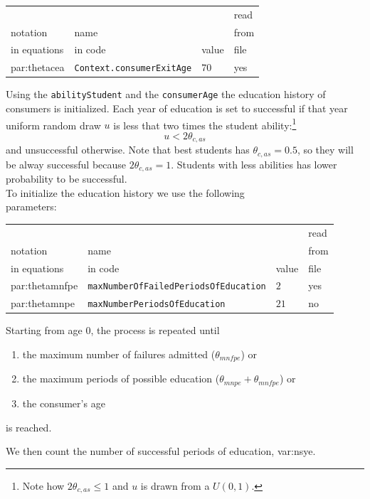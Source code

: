 \documentclass{book}
\begin{document}
\vskip2mm
\noindent
\begin{tabular}{l l l l}
	\hline
	& &&read\\
	notation& name &&from\\
	in equations& in code&value&file\\
	\hline
	\hline
\gls{par:thetacea}&\verb+Context.consumerExitAge+&$70$&yes\\
	\hline
\end{tabular}

\vskip5mm
Using the \verb+abilityStudent+ and the \verb+consumerAge+ the education history of consumers is initialized. Each year of education is set to successful if that year uniform random draw $u$ is less that two times the student ability:\footnote{Note how $2\theta_{c,as}\le 1$ and $u$ is drawn from a $U(0,1)$.}
\[
	u<2\theta_{c,as}
\]
and unsuccessful otherwise.  Note that best students has $\theta_{c,as}=0.5$, so they will be alway successful because $2\theta_{c,as}=1$. Students with less abilities has lower probability to be successful.\\

To initialize the education history we use the following\\ 
parameters:\\

\noindent
\begin{tabular}{l l l l}
	\hline
	& &&read\\
	notation& name &&from\\
	in equations& in code&value&file\\
	\hline
	\hline
\gls{par:thetamnfpe}&\verb+maxNumberOfFailedPeriodsOfEducation+&$2$&yes\\
\gls{par:thetamnpe}&\verb+maxNumberPeriodsOfEducation+&$21$&no\\
	\hline
\end{tabular}

\vskip5mm


Starting from age 0, the process is repeated until 
\begin{enumerate}
	\item the maximum number of failures admitted ($\theta_{mnfpe}$) or
	\item the maximum periods of possible education ($\theta_{mnpe}+\theta_{mnfpe}$) or
	\item the consumer's age 
\end{enumerate}
is reached.

We then count the number of successful periods of education, \gls{var:nsye}. 
\end{document}
